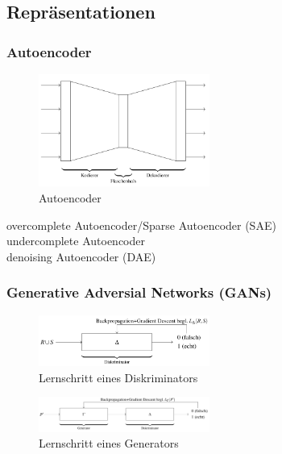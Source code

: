 
\subsection{Repräsentationen}
\label{representations}
\subsubsection{Autoencoder}

\begin{figure}[H]
    \centering
    \includegraphics[width=0.5\textwidth]{deepLearning/autoencoder.png}
    \caption{Autoencoder}
\end{figure}

overcomplete Autoencoder/Sparse Autoencoder (SAE)\\
undercomplete Autoencoder\\

denoising Autoencoder (DAE)\\

\subsubsection{Generative Adversial Networks (GANs)}

\begin{figure}[H]
    \centering
    \includegraphics[width=0.5\textwidth]{deepLearning/discriminator.png}
    \caption{Lernschritt eines Diskriminators}
\end{figure}

\begin{figure}[H]
    \centering
    \includegraphics[width=0.5\textwidth]{deepLearning/generator.png}
    \caption{Lernschritt eines Generators}
\end{figure}
